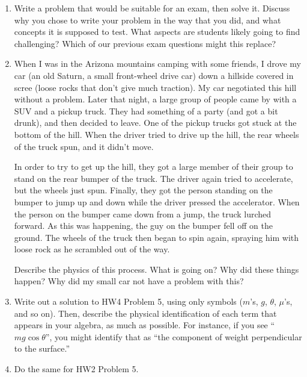 \documentclass[12pt]{article}
\begin{document}
\begin{enumerate}
\item Write a problem that would be suitable for an exam, then solve it. Discuss why you chose to write your problem in the way that you did, and what concepts it is supposed to test. What aspects are students likely 
going to find challenging? Which of our previous exam questions might this replace?

\item When I was in the Arizona mountains camping with some friends, I drove my car (an old Saturn, a small front-wheel drive car) down a hillside covered in scree (loose rocks that don't give much traction). My car negotiated
this hill without a problem. Later that night, a large group of people came by with a SUV and a pickup truck. They had something of a party (and got a bit drunk), and then 
decided to leave. One of the pickup trucks got stuck at the bottom of the hill. When the driver tried to drive up the hill,
the rear wheels of the truck spun, and it didn't move. 

In order to try to get up the hill, they got a large member of their group to stand on the rear bumper of the truck. 
The driver again tried to accelerate, but the wheels just spun. Finally, they got the person standing on the
bumper to jump up and down while the driver pressed the accelerator. When the person on the bumper came down from a jump, the truck lurched forward. As this was happening, the guy on the bumper fell off on the ground.
The wheels of the truck then began to spin again, spraying him with loose rock as he scrambled out of the way.

Describe the physics of this process. What is going on? Why did these things happen? Why did my small car not have a problem with this?

\item Write out a solution to HW4 Problem 5, using only symbols ($m$'s, $g$, $\theta$, $\mu$'s, and so on). Then, describe the physical identification of each term that appears in your algebra, as much as possible.
For instance, if you see ``$mg \cos \theta$'', you might identify that as ``the component of weight perpendicular to the surface.''

\item Do the same for HW2 Problem 5.

\end{enumerate}
\end{document}
